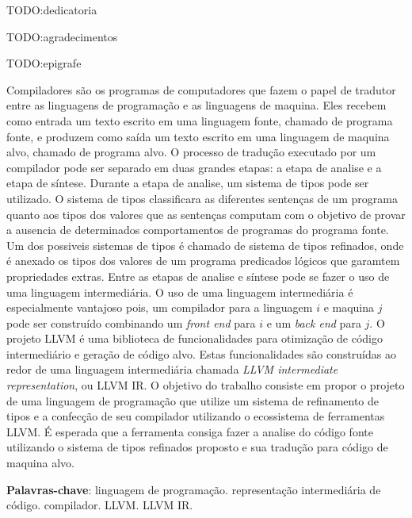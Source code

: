 \documentclass[
  english,
  lmodern,
  oneside
]{ufsc-thesis-rn46-2019/ufsc-thesis-rn46-2019}
\begin{document}
\pretextual{}
\imprimircapa{}
\imprimirfolhaderosto*
\protect%
\imprimirfolhadecertificacao{}



\begin{dedicatoria}
  TODO:\@ dedicatoria
\end{dedicatoria}

\begin{agradecimentos}
  TODO:\@ agradecimentos
\end{agradecimentos}

\begin{epigrafe}
  TODO:\@ epigrafe
\end{epigrafe}


\begin{resumo}[Resumo]
Compiladores são os programas de computadores que fazem o papel de tradutor entre as linguagens de programação e as linguagens de maquina.
Eles recebem como entrada um texto escrito em uma linguagem fonte, chamado de programa fonte, e produzem como saída um texto escrito em uma linguagem de maquina alvo, chamado de programa alvo.
O processo de tradução executado por um compilador pode ser separado em duas grandes etapas: a etapa de analise e a etapa de síntese.
Durante a etapa de analise, um sistema de tipos pode ser utilizado.
O sistema de tipos classificara as diferentes sentenças de um programa quanto aos tipos dos valores que as sentenças computam com o objetivo de provar a ausencia de determinados comportamentos de programas do programa fonte.
Um dos possiveis sistemas de tipos é chamado de sistema de tipos refinados, onde é anexado os tipos dos valores de um programa predicados lógicos que garamtem propriedades extras.
Entre as etapas de analise e síntese pode se fazer o uso de uma linguagem intermediária.
O uso de uma linguagem intermediária é especialmente vantajoso pois, um compilador para a linguagem $i$ e maquina $j$ pode ser construído combinando um \textit{front end} para $i$ e um \textit{back end} para $j$.
O projeto LLVM é uma biblioteca de funcionalidades para otimização de código intermediário e geração de código alvo.
Estas funcionalidades são construídas ao redor de uma linguagem intermediária chamada \textit{LLVM intermediate representation}, ou LLVM IR\@.
O objetivo do trabalho consiste em propor o projeto de uma linguagem de programação que utilize um sistema de refinamento de tipos e a confecção de seu compilador utilizando o ecossistema de ferramentas LLVM\@.
É esperada que a ferramenta consiga fazer a analise do código fonte utilizando o sistema de tipos refinados proposto e sua tradução para código de maquina alvo.

\vspace{\onelineskip}
\noindent
\textbf{Palavras-chave}: linguagem de programação\@. representação intermediária de código\@. compilador\@. LLVM\@. LLVM IR\@.
\end{resumo}
\end{document}
